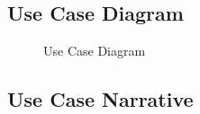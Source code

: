 \subsection{Use Case Diagram}
\begin{figure}[H]\centering
    \setlength{\fboxrule}{0.2mm} %
    \setlength{\fboxsep}{0.5cm}
    \caption{Use Case Diagram}\label{fig:usecase}
\end{figure}
\subsection{Use Case Narrative}
